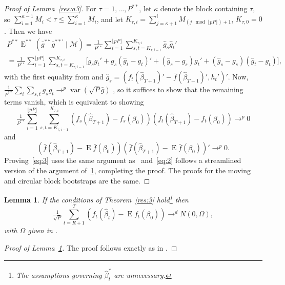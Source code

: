 \documentclass[12pt,fleqn]{article}
\newtheorem{lema}{Lemma}[section]
\theoremstyle{definition}
\DeclareMathOperator{\E}{E}
\DeclareMathOperator{\var}{var}
\begin{document}
\begin{proof}[Proof of Lemma~\ref{res:a3}]
  For $\tau = 1,\dots,P^{**}$, let $\kappa$ denote the block
  containing $\tau$, so $\sum_{i=1}^{\kappa-1} M_i < \tau \leq
  \sum_{i=1}^{\kappa} M_i$, and let $K_{\tau,i} = \sum_{j=\kappa+1}^i
  M_{(j \mod \lfloor p P \rfloor) + 1}$, $K_{\tau,0} = 0$.  Then we have
  \begin{multline}
    P^{**} \E^{**}(\bar{g}^{**} \bar{g}^{**\prime} \mid \mathcal{M})
    = \tfrac{1}{P^{**}} \sum_{i=1}^{\lfloor p P \rfloor} 
    \sum_{s,t=K_{\tau,i-1}}^{K_{\tau,i}} \hat{g}_s \hat{g}_t' 
    \\ = \tfrac{1}{P^{**}} \sum_{i=1}^{\lfloor p P \rfloor}
    \sum_{s,t=K_{\tau,i-1}}^{K_{\tau,i}} \big[g_s g_t' + g_s(\hat{g}_t
    - g_{t})' + (\hat{g}_s - g_{s}) g_{t}' + (\hat{g}_s -
    g_{s})(\hat{g}_t - g_{t}) \big],
  \end{multline}
  with the first equality from \citet{Cal:11d} and $\hat{g}_s =
  (f_t(\hat{\beta}_{T+1})' - \bar f(\hat{\beta}_{T+1})', h_t')'$.
  Now, $\frac{1}{P^{**}} \sum_i \sum_{s,t} g_s g_t \to^p \var(\sqrt{P} \bar{g})$
  \citep[Lemma~5]{Cal:11d}, so it suffices to show that the remaining
  terms vanish, which is equivalent to showing
  \begin{equation}\label{eq:3}
    \tfrac{1}{P^{**}} \sum_{i=1}^{\lfloor p P \rfloor}\sum_{s,t =
      K_{\tau,i-1}}^{K_{\tau,i}} (f_s(\hat{\beta}_{T+1}) -
    f_s(\beta_0)) (f_t(\hat{\beta}_{T+1}) - f_t(\beta_0))
    \to^p 0
  \end{equation}
  and
  \begin{equation}\label{eq:2}
    (\bar{f}(\hat{\beta}_{T+1}) - \E
    \bar{f}(\beta_0)) (\bar{f}(\hat{\beta}_{T+1}) - \E
    \bar{f}(\beta_0))' \to^p 0.
  \end{equation}
  Proving~\eqref{eq:3} uses the same argument as~\citet[Lemma
  A.3]{Mcc:00} and~\eqref{eq:2} follows a streamlined version of the
  argument of~\ref{res:a5}, completing the proof.  The proofs for the
  moving and circular block bootstraps are the same.
\end{proof}

\begin{lema}\label{res:a5}
  If the conditions of Theorem~\ref{res:3} hold\footnote{The
    assumptions governing $\hat{\beta}_t^{*}$ are unnecessary.} then
  \begin{equation}
    \tfrac{1}{\sqrt{P}} \sum_{t=R+1}^T
    (f_{t}(\hat{\beta}_{t}) - \E f_{t}(\beta_{0})) \to^d N(0, \Omega),
  \end{equation}
  with $\Omega$ given in \citet[Theorem 2.3.1]{Mcc:00}.
\end{lema}
\begin{proof}[Proof of Lemma~\ref{res:a5}]
  The proof follows exactly as in \citet[Theorem 2.3.1]{Mcc:00}.
\end{proof}
\end{document}
